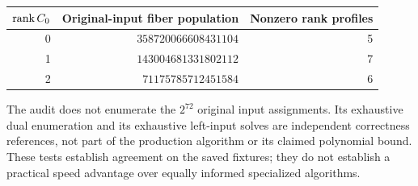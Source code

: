 \documentclass[11pt]{article}
\begin{document}
\begin{center}
\begin{tabular}{rrr}
\toprule
$\operatorname{rank} C_0$ & Original-input fiber population & Nonzero rank profiles\\
\midrule
0 & $358720066608431104$ & 5\\
1 & $143004681331802112$ & 7\\
2 & $71175785712451584$ & 6\\
\bottomrule
\end{tabular}
\end{center}

The audit does not enumerate the $2^{72}$ original input assignments.
Its exhaustive dual enumeration and its exhaustive left-input solves
are independent correctness references, not part of the production
algorithm or its claimed polynomial bound. These tests establish
agreement on the saved fixtures; they do not establish a practical
speed advantage over equally informed specialized algorithms.
\end{document}
